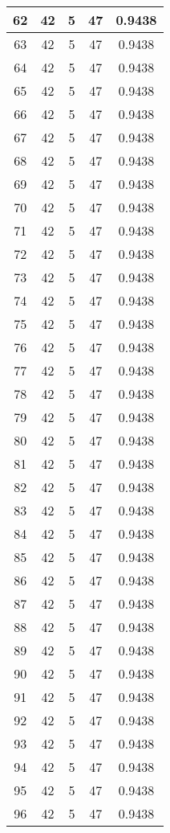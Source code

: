 \documentclass[letterpaper, 12pt]{article}
\begin{document}
\begin{longtable}{|c|c|c|c|c|}
\hline
62 & 42 & 5 & 47 & 0.9438 \\
\hline
63 & 42 & 5 & 47 & 0.9438 \\
\hline
64 & 42 & 5 & 47 & 0.9438 \\
\hline
65 & 42 & 5 & 47 & 0.9438 \\
\hline
66 & 42 & 5 & 47 & 0.9438 \\
\hline
67 & 42 & 5 & 47 & 0.9438 \\
\hline
68 & 42 & 5 & 47 & 0.9438 \\
\hline
69 & 42 & 5 & 47 & 0.9438 \\
\hline
70 & 42 & 5 & 47 & 0.9438 \\
\hline
71 & 42 & 5 & 47 & 0.9438 \\
\hline
72 & 42 & 5 & 47 & 0.9438 \\
\hline
73 & 42 & 5 & 47 & 0.9438 \\
\hline
74 & 42 & 5 & 47 & 0.9438 \\
\hline
75 & 42 & 5 & 47 & 0.9438 \\
\hline
76 & 42 & 5 & 47 & 0.9438 \\
\hline
77 & 42 & 5 & 47 & 0.9438 \\
\hline
78 & 42 & 5 & 47 & 0.9438 \\
\hline
79 & 42 & 5 & 47 & 0.9438 \\
\hline
80 & 42 & 5 & 47 & 0.9438 \\
\hline
81 & 42 & 5 & 47 & 0.9438 \\
\hline
82 & 42 & 5 & 47 & 0.9438 \\
\hline
83 & 42 & 5 & 47 & 0.9438 \\
\hline
84 & 42 & 5 & 47 & 0.9438 \\
\hline
85 & 42 & 5 & 47 & 0.9438 \\
\hline
86 & 42 & 5 & 47 & 0.9438 \\
\hline
87 & 42 & 5 & 47 & 0.9438 \\
\hline
88 & 42 & 5 & 47 & 0.9438 \\
\hline
89 & 42 & 5 & 47 & 0.9438 \\
\hline
90 & 42 & 5 & 47 & 0.9438 \\
\hline
91 & 42 & 5 & 47 & 0.9438 \\
\hline
92 & 42 & 5 & 47 & 0.9438 \\
\hline
93 & 42 & 5 & 47 & 0.9438 \\
\hline
94 & 42 & 5 & 47 & 0.9438 \\
\hline
95 & 42 & 5 & 47 & 0.9438 \\
\hline
96 & 42 & 5 & 47 & 0.9438 \\

\end{longtable}
\end{document}
